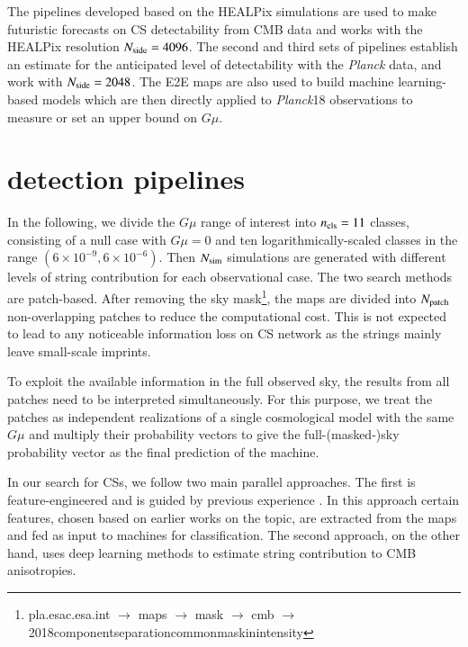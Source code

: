 \documentclass[fleqn,usenatbib]{mnras}
\begin{document}
The pipelines developed based on the HEALPix simulations are used to make futuristic forecasts on CS detectability from CMB data and works with the HEALPix resolution $N_{\rm side}=4096$.
 The second and third sets of pipelines establish an estimate for the anticipated level of detectability with the {\it Planck} data, and work with  $N_{\rm side}=2048$.
The E2E maps are also used to build machine learning-based models which are then directly applied to {\it Planck}18 observations to measure or set an upper bound on $G\mu$. 
\section{detection pipelines}
\label{sec:det}

In the following, we divide the $G\mu$ range of interest into $n_{\rm cls}=11$ classes, consisting of a null case with $G\mu=0$ and ten logarithmically-scaled classes in the range $(6\times 10^{-9},6\times 10^{-6})$.  
Then $N_{\rm sim}$ simulations are generated with different levels of string contribution  for each observational case.
The two search methods are patch-based.  After removing the sky mask\footnote{pla.esac.esa.int $\to$ maps $\to$ mask $\to$ cmb $\to$ 2018\;component\;separation\;common\;mask\;in\;intensity}, the maps are divided into $N_{\rm patch}$ non-overlapping patches to reduce the computational cost. This is not  expected to lead to any noticeable  information loss on CS network
as the strings mainly leave small-scale imprints.  

To exploit the available information in the full observed sky, the results from all patches need to be interpreted simultaneously. 
For this purpose, we treat the patches as independent realizations of a single cosmological model with the same $G\mu$ and multiply their probability vectors to give the full-(masked-)sky probability vector as the final prediction of the machine. 


In our search for CSs, we follow two main parallel approaches.
 The first is feature-engineered and is guided by previous experience \citep{vaf17,vafaei2021clustering}. In this approach certain features, chosen based on earlier works on the topic, are extracted from the maps 
 and fed as input to machines for classification. 
%
The second approach, on the other hand, uses deep learning methods to estimate string contribution to CMB anisotropies. 
\end{document}
